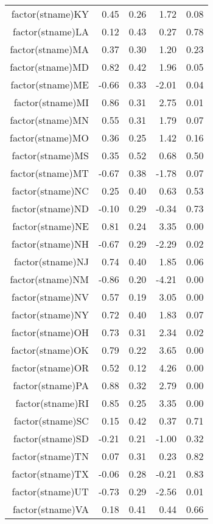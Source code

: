 \begin{table}[ht]
\begin{tabular}{rrrrr}
  factor(stname)KY & 0.45 & 0.26 & 1.72 & 0.08 \\ 
  factor(stname)LA & 0.12 & 0.43 & 0.27 & 0.78 \\ 
  factor(stname)MA & 0.37 & 0.30 & 1.20 & 0.23 \\ 
  factor(stname)MD & 0.82 & 0.42 & 1.96 & 0.05 \\ 
  factor(stname)ME & -0.66 & 0.33 & -2.01 & 0.04 \\ 
  factor(stname)MI & 0.86 & 0.31 & 2.75 & 0.01 \\ 
  factor(stname)MN & 0.55 & 0.31 & 1.79 & 0.07 \\ 
  factor(stname)MO & 0.36 & 0.25 & 1.42 & 0.16 \\ 
  factor(stname)MS & 0.35 & 0.52 & 0.68 & 0.50 \\ 
  factor(stname)MT & -0.67 & 0.38 & -1.78 & 0.07 \\ 
  factor(stname)NC & 0.25 & 0.40 & 0.63 & 0.53 \\ 
  factor(stname)ND & -0.10 & 0.29 & -0.34 & 0.73 \\ 
  factor(stname)NE & 0.81 & 0.24 & 3.35 & 0.00 \\ 
  factor(stname)NH & -0.67 & 0.29 & -2.29 & 0.02 \\ 
  factor(stname)NJ & 0.74 & 0.40 & 1.85 & 0.06 \\ 
  factor(stname)NM & -0.86 & 0.20 & -4.21 & 0.00 \\ 
  factor(stname)NV & 0.57 & 0.19 & 3.05 & 0.00 \\ 
  factor(stname)NY & 0.72 & 0.40 & 1.83 & 0.07 \\ 
  factor(stname)OH & 0.73 & 0.31 & 2.34 & 0.02 \\ 
  factor(stname)OK & 0.79 & 0.22 & 3.65 & 0.00 \\ 
  factor(stname)OR & 0.52 & 0.12 & 4.26 & 0.00 \\ 
  factor(stname)PA & 0.88 & 0.32 & 2.79 & 0.00 \\ 
  factor(stname)RI & 0.85 & 0.25 & 3.35 & 0.00 \\ 
  factor(stname)SC & 0.15 & 0.42 & 0.37 & 0.71 \\ 
  factor(stname)SD & -0.21 & 0.21 & -1.00 & 0.32 \\ 
  factor(stname)TN & 0.07 & 0.31 & 0.23 & 0.82 \\ 
  factor(stname)TX & -0.06 & 0.28 & -0.21 & 0.83 \\ 
  factor(stname)UT & -0.73 & 0.29 & -2.56 & 0.01 \\ 
  factor(stname)VA & 0.18 & 0.41 & 0.44 & 0.66 \\ 

\end{tabular}
\end{table}
